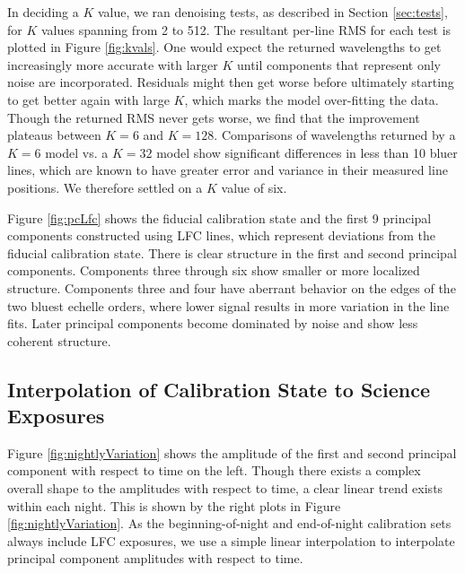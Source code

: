 \documentclass[modern]{aastex63}
\begin{document}
In deciding a $K$ value, we ran denoising tests, as described in Section \ref{sec:tests}, for $K$ values spanning from 2 to 512.  The resultant per-line RMS for each test is plotted in Figure \ref{fig:kvals}.  One would expect the returned wavelengths to get increasingly more accurate with larger $K$ until components that represent only noise are incorporated.  Residuals might then get worse before ultimately starting to get better again with large $K$, which marks the model over-fitting the data.  Though the returned RMS never gets worse, we find that the improvement plateaus between $K=6$ and $K=128$.  Comparisons of wavelengths returned by a $K=6$ model vs. a $K=32$ model show significant differences in less than 10 bluer lines, which are known to have greater error and variance in their measured line positions.  We therefore settled on a $K$ value of six.

Figure \ref{fig:pcLfc} shows the fiducial calibration state and the first 9 principal components constructed using LFC lines, which represent deviations from the fiducial calibration state.  There is clear structure in the first and second principal components.  Components three through six show smaller or more localized structure.  Components three and four have aberrant behavior on the edges of the two bluest echelle orders, where lower signal results in more variation in the line fits.  Later principal components become dominated by noise and show less coherent structure.
\pagebreak
\subsection{Interpolation of Calibration State to Science Exposures}
\label{sec:choice_avt}
Figure \ref{fig:nightlyVariation} shows the amplitude of the first and second principal component with respect to time on the left.  Though there exists a complex overall shape to the amplitudes with respect to time, a clear linear trend exists within each night.  This is shown by the right plots in Figure  \ref{fig:nightlyVariation}.  As the beginning-of-night and end-of-night calibration sets always include LFC exposures, we use a simple linear interpolation to interpolate principal component amplitudes with respect to time.
\end{document}
